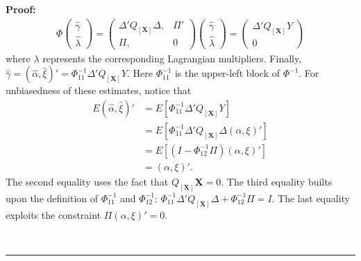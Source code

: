 \documentclass[12pt]{article}
\newenvironment{proof}[1][Proof]{\noindent\textbf{#1:} }{\  \rule{0.5em}{0.5em}}
\begin{document}
\begin{proof}
\begin{align*}
\Phi \begin{pmatrix}
  \hat{\gamma} \\
  \hat{\lambda}
\end{pmatrix} = 
\begin{pmatrix}
  \Delta' Q_{[\mathbf{X}]} \Delta, & \Pi' \\
  \Pi, & 0
\end{pmatrix} \begin{pmatrix}
  \hat{\gamma} \\
  \hat{\lambda}
\end{pmatrix} = \begin{pmatrix}
  \Delta' Q_{[\mathbf{X}]} Y \\
  0
\end{pmatrix}
\end{align*}
where $\lambda$ represents the corresponding Lagrangian multipliers. Finally, $\hat{\gamma} = (\hat{\alpha}, \hat{\xi})' = \Phi^{-1}_{11} \Delta' Q_{[\mathbf{X}]} Y$. Here $\Phi^{-1}_{11}$ is the upper-left block of $\Phi^{-1}$. 
For unbiasedness of these estimates, notice that
\begin{align*}
E(\hat{\alpha}, \hat{\xi})' & = E[\Phi^{-1}_{11} \Delta' Q_{[\mathbf{X}]} Y] \\
& = E[\Phi^{-1}_{11} \Delta' Q_{[\mathbf{X}]} \Delta (\alpha, \xi)'] \\
& = E[(I - \Phi^{-1}_{12}\Pi)(\alpha, \xi)'] \\
& = (\alpha, \xi)'.
\end{align*}
\noindent The second equality uses the fact that $Q_{[\mathbf{X}]}\mathbf{X} = 0$. The third equality builts upon the definition of $\Phi^{-1}_{11}$ and $\Phi^{-1}_{12}$: $\Phi^{-1}_{11} \Delta' Q_{[\mathbf{X}]}\Delta + \Phi^{-1}_{12}\Pi = I$. The last equality exploits the constraint $\Pi (\alpha, \xi)' = 0$.


\end{proof}
\end{document}
